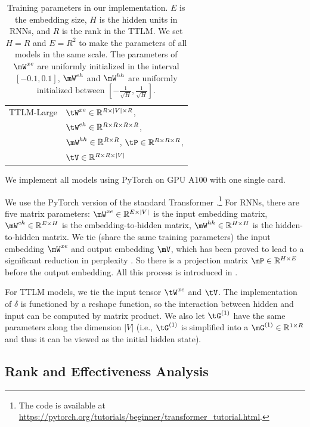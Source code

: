 \documentclass{article}
\theoremstyle{plain}
\theoremstyle{definition}
\theoremstyle{remark}
\begin{document}
\begin{table}[ht]
\begin{tabular}{ll}
        \hline
        TTLM-Large & $\tW^{xe}\in\mathbb{R}^{R\times |V|\times R}$, \\ & $\tW^{eh}\in\mathbb{R}^{R\times R\times R\times R}$, \\
        & $\mW^{hh}\in\mathbb{R}^{R\times R}$, $\tP\in\mathbb{R}^{R\times R\times R}$, \\
        &  $\tV\in\mathbb{R}^{R\times R\times |V|}$\\
    \bottomrule
    \end{tabular}
    \caption{Training parameters in our implementation. $E$ is the embedding size, $H$ is the hidden units in RNNs, and $R$ is the rank in the TTLM.  We set $H=R$ and $E=R^2$ to make the parameters of all models in the same scale. The parameters of $\mW^{xe}$ are uniformly initialized in the interval $[-0.1,0.1]$, $\mW^{eh}$ and $\mW^{hh}$ are uniformly initialized between $[-\frac{1}{\sqrt{H}}, \frac{1}{\sqrt{H}}]$.}
    \label{tab:my_label}
\end{table}

We implement all models using PyTorch on GPU A100 with one single card. 

We use the PyTorch version of the standard Transformer \citep{vaswani2017attention}.\footnote{The code is available at \url{https://pytorch.org/tutorials/beginner/transformer_tutorial.html}.} For RNNs, there are five matrix parameters: $\mW^{xe}\in \mathbb{R}^{E\times |V|}$ is the input embedding matrix, $\mW^{eh}\in
\mathbb{R}^{E\times H}$ is the embedding-to-hidden matrix, $\mW^{hh}\in \mathbb{R}^{H\times H}$ is the hidden-to-hidden matrix. We tie (share the same training parameters) the input embedding  $\mW^{xe}$ and output embedding $\mV$, which has been proved to lead to a significant reduction in perplexity \citep{press2016using}. So there is a projection matrix $\mP\in\mathbb{R}^{H\times E}$ before the output embedding. All this process is introduced in  \citep{press2016using}. 

For TTLM models, we tie the input tensor $\tW^{xe}$ and $\tV$. The implementation of $\delta$ is functioned by a reshape function, so the interaction between hidden and input can be computed by matrix product. We also let $\tG^{(1)}$ have the same parameters along the dimension $|V|$ (i.e., $\tG^{(1)}$ is simplified into a  $\mG^{(1)}\in\mathbb{R}^{1\times R}$ and thus it can be viewed as the initial hidden state).  


\subsection{Rank and Effectiveness Analysis}
\label{sec: rank}
\end{document}
